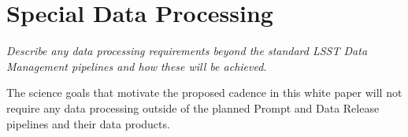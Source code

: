 \documentclass[12pt, letterpaper]{article}
\begin{document}
\vspace{.6in}

\clearpage
\section{Special Data Processing}
\begin{footnotesize}
{\it Describe any data processing requirements beyond the standard LSST Data Management pipelines and how these will be achieved.}
\end{footnotesize}

The science goals that motivate the proposed cadence in this white paper will not require any data processing outside of the planned Prompt and Data Release pipelines and their data products. 




\end{document}
